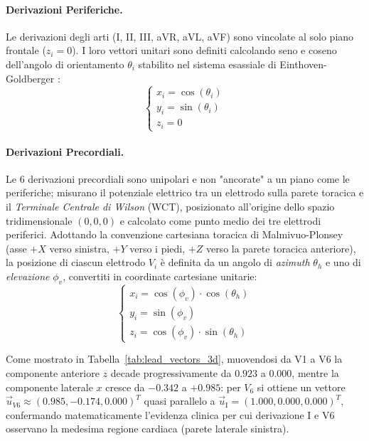 \paragraph{Derivazioni Periferiche.}
Le derivazioni degli arti (I, II, III, aVR, aVL, aVF) sono vincolate al solo piano frontale ($z_i = 0$). I loro vettori unitari sono definiti calcolando seno e coseno dell'angolo di orientamento $\theta_i$ stabilito nel sistema esassiale di Einthoven-Goldberger \cite{goldberger2017ecg}:
\begin{equation}
	\begin{cases}
		x_i = \cos(\theta_i) \\
		y_i = \sin(\theta_i) \\
		z_i = 0
	\end{cases}
\end{equation}

\paragraph{Derivazioni Precordiali.}
Le 6 derivazioni precordiali sono unipolari e non "ancorate" a un piano come le periferiche; misurano il potenziale elettrico tra un elettrodo sulla parete toracica e il \textit{Terminale Centrale di Wilson} (WCT), posizionato all'origine dello spazio tridimensionale $(0,0,0)$ e calcolato come punto medio dei tre elettrodi periferici. Adottando la convenzione cartesiana toracica di Malmivuo-Plonsey \cite{malmivuo1995bioelectromagnetism} (asse $+X$ verso sinistra, $+Y$ verso i piedi, $+Z$ verso la parete toracica anteriore), la posizione di ciascun elettrodo $V_i$ è definita da un angolo di \textit{azimuth} $\theta_h$ e uno di \textit{elevazione} $\phi_v$, convertiti in coordinate cartesiane unitarie:
\begin{equation}
	\begin{cases}
		x_i = \cos(\phi_v) \cdot \cos(\theta_h) \\
		y_i = \sin(\phi_v) \\
		z_i = \cos(\phi_v) \cdot \sin(\theta_h)
	\end{cases}
\end{equation}

Come mostrato in Tabella~\ref{tab:lead_vectors_3d}, muovendosi da V1 a V6 la componente anteriore $z$ decade progressivamente da $0.923$ a $0.000$, mentre la componente laterale $x$ cresce da $-0.342$ a $+0.985$: per $V_6$ si ottiene un vettore $\vec{u}_{V6}\approx(0.985,-0.174,0.000)^T$ quasi parallelo a $\vec{u}_{\text{I}}=(1.000,0.000,0.000)^T$, confermando matematicamente l'evidenza clinica per cui derivazione I e V6 osservano la medesima regione cardiaca (parete laterale sinistra).

